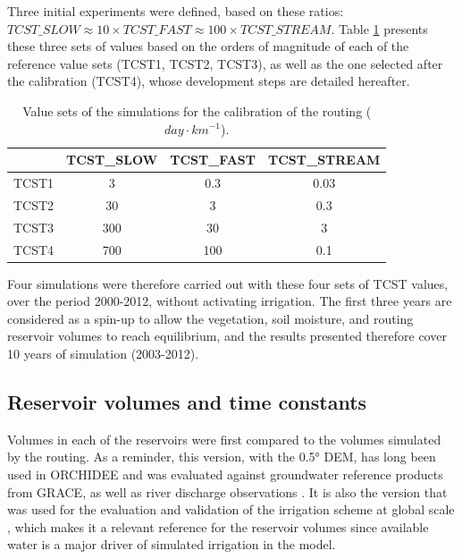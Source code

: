 Three initial experiments were defined, based on these ratios:\\$TCST\_SLOW \approx 10 \times TCST\_FAST \approx 100 \times TCST\_STREAM$.
Table \ref{table:tcst_exp} presents these three sets of values based on the orders of magnitude of each of the reference value sets (TCST1, TCST2, TCST3), as well as the one selected after the calibration (TCST4), whose development steps are detailed hereafter.

\begin{table}[h]
\centering
\begin{tabular}{|l|c|c|c|}
\hline
\textbf{} & \textbf{TCST\_SLOW} & \textbf{TCST\_FAST} & \textbf{TCST\_STREAM} \\ \hline
TCST1 & 3 & 0.3 & 0.03 \\ \hline
TCST2 & 30 & 3 & 0.3 \\ \hline
TCST3 & 300 & 30 & 3 \\ \hline
TCST4 & 700 & 100 & 0.1 \\ \hline
\end{tabular}
\caption{Value sets of the simulations for the calibration of the \native routing ($day \cdot km^{-1}$).}
\label{table:tcst_exp}
\end{table}

Four simulations were therefore carried out with these four sets of TCST values, over the period 2000-2012, without activating irrigation.
The first three years are considered as a spin-up to allow the vegetation, soil moisture, and routing reservoir volumes to reach equilibrium, and the results presented therefore cover 10 years of simulation (2003-2012). %

\subsection{Reservoir volumes and time constants}

Volumes in each of the reservoirs were first compared to the volumes simulated by the \std routing. As a reminder, this version, with the 0.5° DEM, has long been used in ORCHIDEE and was evaluated against groundwater reference products from GRACE, as well as river discharge observations  \citep{ngo-duc_validation_2007}. %
It is also the version that was used for the evaluation and validation of the irrigation scheme at global scale \citep{arboleda-obando_validation_2024}, which makes it a relevant reference for the reservoir volumes since available water is a major driver of simulated irrigation in the model. 

